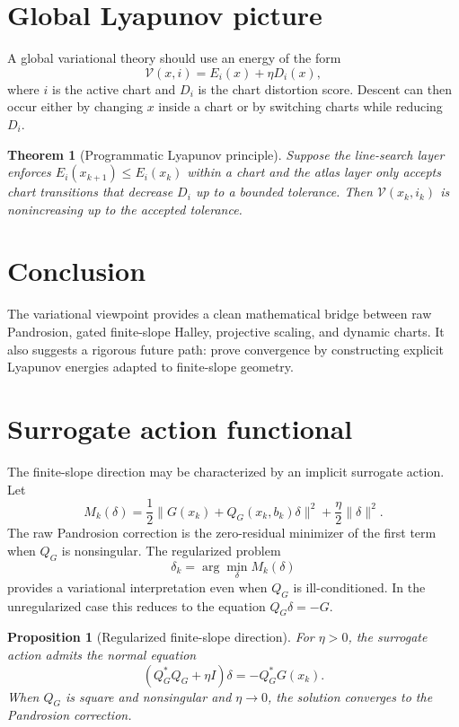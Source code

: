 \documentclass[11pt]{article}
\newtheorem{proposition}[definition]{Proposition}
\newtheorem{theorem}[definition]{Theorem}
\begin{document}
\section{Global Lyapunov picture}
A global variational theory should use an energy of the form
\[
        \mathcal V(x,i)=E_i(x)+\eta D_i(x),
\]
where $i$ is the active chart and $D_i$ is the chart distortion score.  Descent can then occur either by changing $x$ inside a chart or by switching charts while reducing $D_i$.

\begin{theorem}[Programmatic Lyapunov principle]
Suppose the line-search layer enforces $E_i(x_{k+1})\le E_i(x_k)$ within a chart and the atlas layer only accepts chart transitions that decrease $D_i$ up to a bounded tolerance.  Then $\mathcal V(x_k,i_k)$ is nonincreasing up to the accepted tolerance.
\end{theorem}

\section{Conclusion}
The variational viewpoint provides a clean mathematical bridge between raw Pandrosion, gated finite-slope Halley, projective scaling, and dynamic charts.  It also suggests a rigorous future path: prove convergence by constructing explicit Lyapunov energies adapted to finite-slope geometry.


\section{Surrogate action functional}
The finite-slope direction may be characterized by an implicit surrogate action.  Let
\[
        M_k(\delta)=\frac12\|G(x_k)+Q_G(x_k,b_k)\delta\|^2+\frac{\eta}{2}\|\delta\|^2.
\]
The raw Pandrosion correction is the zero-residual minimizer of the first term when $Q_G$ is nonsingular.  The regularized problem
\[
        \delta_k=\arg\min_\delta M_k(\delta)
\]
provides a variational interpretation even when $Q_G$ is ill-conditioned.  In the unregularized case this reduces to the equation $Q_G\delta=-G$.

\begin{proposition}[Regularized finite-slope direction]
For $\eta>0$, the surrogate action admits the normal equation
\[
        (Q_G^*Q_G+\eta I)\delta=-Q_G^*G(x_k).
\]
When $Q_G$ is square and nonsingular and $\eta\to 0$, the solution converges to the Pandrosion correction.
\end{proposition}
\end{document}
